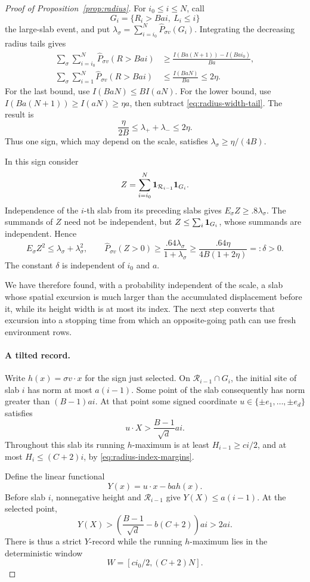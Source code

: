 \begin{proof}[Proof of Proposition~\ref{prop:radius}]
For \(i_0\le i\le N\), call
\[
 G_i=\{R_i>Bai,\ L_i\le i\}
\]
the large-slab event, and put
\(\lambda_\sigma=\sum_{i=i_0}^N\widehat P_{\sigma v}(G_i)\).
Integrating the decreasing radius tails gives
\begin{align*}
 \sum_\sigma\sum_{i=i_0}^N\widehat P_{\sigma v}(R>Bai)
 &\ge \frac{I(Ba(N+1))-I(Bai_0)}{Ba},\\
 \sum_\sigma\sum_{i=1}^N\widehat P_{\sigma v}(R>Bai)
 &\le\frac{I(BaN)}{Ba}\le2\eta.
\end{align*}
For the last bound, use \(I(BaN)\le B I(aN)\).  For the lower
bound, use \(I(Ba(N+1))\ge I(aN)\ge\eta a\), then subtract
\eqref{eq:radius-width-tail}.  The result is
\[
 \frac{\eta}{2B}\le\lambda_++\lambda_-\le2\eta.
\]
Thus one sign, which may depend on the scale, satisfies
\(\lambda_\sigma\ge\eta/(4B)\).

In this sign consider
\[
 Z=\sum_{i=i_0}^N\mathbf 1_{\mathcal R_{i-1}}\mathbf 1_{G_i}.
\]
Independence of the \(i\)-th slab from its preceding slabs gives
\(E_\sigma Z\ge.8\lambda_\sigma\).  The summands of \(Z\) need
not be independent, but \(Z\le\sum_i\mathbf 1_{G_i}\), whose summands
are independent.  Hence
\[
 E_\sigma Z^2\le\lambda_\sigma+\lambda_\sigma^2,
 \qquad
 \widehat P_{\sigma v}(Z>0)
 \ge\frac{.64\lambda_\sigma}{1+\lambda_\sigma}
 \ge\frac{.64\eta}{4B(1+2\eta)}=:\delta>0.
\]
The constant \(\delta\) is independent of \(i_0\) and \(a\).

We have therefore found, with a probability independent of the scale,
a slab whose spatial excursion is much larger than the accumulated
displacement before it, while its height width is at most its index.
The next step converts that excursion into a stopping time from which
an opposite-going path can use fresh environment rows.

\paragraph{A tilted record.}
Write \(h(x)=\sigma v\cdot x\) for the sign just selected.  On
\(\mathcal R_{i-1}\cap G_i\), the initial site of slab \(i\) has
norm at most \(a(i-1)\).  Some point of the slab consequently has
norm greater than \((B-1)ai\).  At that point some signed coordinate
\(u\in\{\pm e_1,\ldots,\pm e_d\}\) satisfies
\[
 u\cdot X>\frac{B-1}{\sqrt d}ai.
\]
Throughout this slab its running \(h\)-maximum is at least
\(H_{i-1}\ge ci/2\), and at most
\(H_i\le(C+2)i\), by \eqref{eq:radius-index-margins}.

Define the linear functional
\[
 Y(x)=u\cdot x-ba h(x).
\]
Before slab \(i\), nonnegative height and \(\mathcal R_{i-1}\)
give \(Y(X)\le a(i-1)\).  At the selected point,
\[
 Y(X)>\left(\frac{B-1}{\sqrt d}-b(C+2)\right)ai>2ai.
\]
There is thus a strict \(Y\)-record while the running \(h\)-maximum
lies in the deterministic window
\begin{equation}\label{eq:radius-window}
 W=[ci_0/2,(C+2)N].
\end{equation}


\end{proof}

